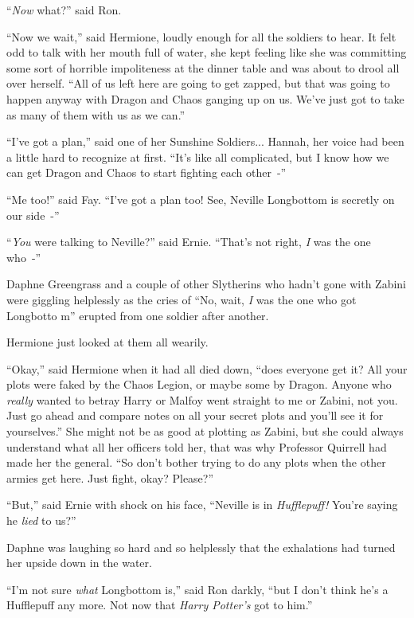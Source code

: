 ``\emph{Now} what?'' said Ron.

``Now we wait,'' said Hermione, loudly enough for all the soldiers to hear. It felt odd to talk with her mouth full of water, she kept feeling like she was committing some sort of horrible impoliteness at the dinner table and was about to drool all over herself. ``All of us left here are going to get zapped, but that was going to happen anyway with Dragon and Chaos ganging up on us. We've just got to take as many of them with us as we can.''

``I've got a plan,'' said one of her Sunshine Soldiers... Hannah, her voice had been a little hard to recognize at first. ``It's like all complicated, but I know how we can get Dragon and Chaos to start fighting each other~-''

``Me too!'' said Fay. ``I've got a plan too! See, Neville Longbottom is secretly on our side~-''

``\emph{You} were talking to Neville?'' said Ernie. ``That's not right, \emph{I} was the one who~-''

Daphne Greengrass and a couple of other Slytherins who hadn't gone with Zabini were giggling helplessly as the cries of ``No, wait, \emph{I} was the one who got Longbotto m'' erupted from one soldier after another.

Hermione just looked at them all wearily.

``Okay,'' said Hermione when it had all died down, ``does everyone get it? All your plots were faked by the Chaos Legion, or maybe some by Dragon. Anyone who \emph{really} wanted to betray Harry or Malfoy went straight to me or Zabini, not you. Just go ahead and compare notes on all your secret plots and you'll see it for yourselves.'' She might not be as good at plotting as Zabini, but she could always understand what all her officers told her, that was why Professor Quirrell had made her the general. ``So don't bother trying to do any plots when the other armies get here. Just fight, okay? Please?''

``But,'' said Ernie with shock on his face, ``Neville is in \emph{Hufflepuff!} You're saying he \emph{lied} to us?''

Daphne was laughing so hard and so helplessly that the exhalations had turned her upside down in the water.

``I'm not sure \emph{what} Longbottom is,'' said Ron darkly, ``but I don't think he's a Hufflepuff any more. Not now that \emph{Harry Potter's} got to him.''

